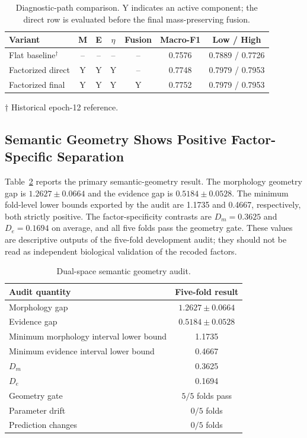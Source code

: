 \documentclass[conference]{IEEEtran}
\begin{document}
\begin{table}[!htbp]
\caption{Diagnostic-path comparison. Y indicates an active component; the
direct row is evaluated before the final mass-preserving fusion.}
\label{tab:path}
\centering
\footnotesize
\setlength{\tabcolsep}{2.3pt}
\begin{tabular}{lcccccc}
\toprule
Variant & M & E & $\eta$ & Fusion & Macro-F1 & Low / High \\
\midrule
Flat baseline$^\dagger$ & -- & -- & -- & -- & 0.7576 & 0.7889 / 0.7726 \\
Factorized direct & Y & Y & Y & -- & 0.7748 & 0.7979 / 0.7953 \\
Factorized final & Y & Y & Y & Y & 0.7752 & 0.7979 / 0.7953 \\
\bottomrule
\end{tabular}
\vskip 2pt
{\scriptsize $\dagger$ Historical epoch-12 reference.}
\end{table}

\subsection{Semantic Geometry Shows Positive Factor-Specific Separation}
Table~\ref{tab:geometry} reports the primary semantic-geometry result.
The morphology geometry gap is $1.2627\pm0.0664$ and the evidence gap is
$0.5184\pm0.0528$. The minimum fold-level lower bounds exported by the
audit are 1.1735 and 0.4667, respectively, both strictly positive. The
factor-specificity contrasts are $D_m=0.3625$ and $D_e=0.1694$ on
average, and all five folds pass the geometry gate. These values are
descriptive outputs of the five-fold development audit; they should not
be read as independent biological validation of the recoded factors.

\begin{table}[!htbp]
\caption{Dual-space semantic geometry audit.}
\label{tab:geometry}
\centering
\footnotesize
\setlength{\tabcolsep}{3.0pt}
\begin{tabular}{lc}
\toprule
Audit quantity & Five-fold result \\
\midrule
Morphology gap & $1.2627\pm0.0664$ \\
Evidence gap & $0.5184\pm0.0528$ \\
Minimum morphology interval lower bound & 1.1735 \\
Minimum evidence interval lower bound & 0.4667 \\
$D_m$ & 0.3625 \\
$D_e$ & 0.1694 \\
Geometry gate & $5/5$ folds pass \\
Parameter drift & $0/5$ folds \\
Prediction changes & $0/5$ folds \\
\bottomrule
\end{tabular}
\end{table}
\end{document}

